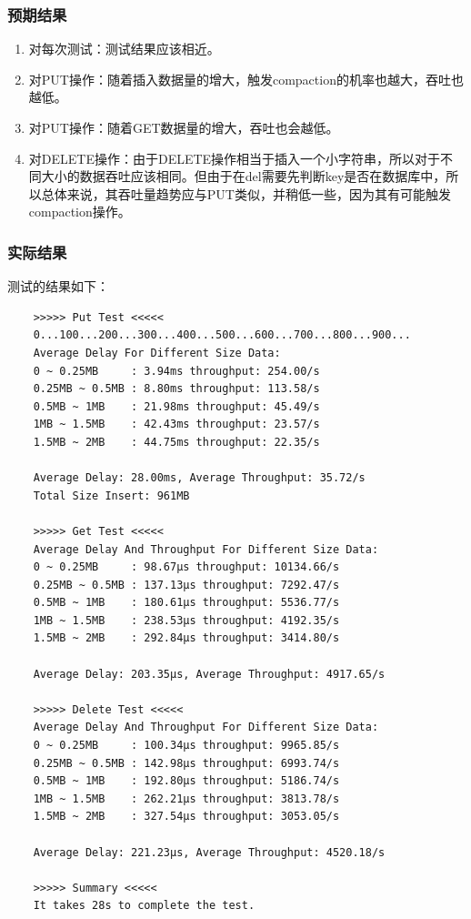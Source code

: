 \documentclass{ctexart}
\begin{document}
\subsubsection{预期结果}
\begin{enumerate}
  \item 对每次测试：测试结果应该相近。
  \item 对PUT操作：随着插入数据量的增大，触发compaction的机率也越大，吞吐也越低。
  \item 对PUT操作：随着GET数据量的增大，吞吐也会越低。
  \item 对DELETE操作：由于DELETE操作相当于插入一个小字符串，所以对于不同大小的数据吞吐应该相同。但由于在del需要先判断key是否在数据库中，所以总体来说，其吞吐量趋势应与PUT类似，并稍低一些，因为其有可能触发compaction操作。
\end{enumerate}

\subsubsection{实际结果}
测试的结果如下：
\begin{verbatim}
    >>>>> Put Test <<<<<
    0...100...200...300...400...500...600...700...800...900...
    Average Delay For Different Size Data:
    0 ~ 0.25MB     : 3.94ms throughput: 254.00/s
    0.25MB ~ 0.5MB : 8.80ms throughput: 113.58/s
    0.5MB ~ 1MB    : 21.98ms throughput: 45.49/s
    1MB ~ 1.5MB    : 42.43ms throughput: 23.57/s
    1.5MB ~ 2MB    : 44.75ms throughput: 22.35/s
    
    Average Delay: 28.00ms, Average Throughput: 35.72/s
    Total Size Insert: 961MB
    
    >>>>> Get Test <<<<<
    Average Delay And Throughput For Different Size Data:
    0 ~ 0.25MB     : 98.67µs throughput: 10134.66/s
    0.25MB ~ 0.5MB : 137.13µs throughput: 7292.47/s
    0.5MB ~ 1MB    : 180.61µs throughput: 5536.77/s
    1MB ~ 1.5MB    : 238.53µs throughput: 4192.35/s
    1.5MB ~ 2MB    : 292.84µs throughput: 3414.80/s
    
    Average Delay: 203.35µs, Average Throughput: 4917.65/s
    
    >>>>> Delete Test <<<<<
    Average Delay And Throughput For Different Size Data:
    0 ~ 0.25MB     : 100.34µs throughput: 9965.85/s
    0.25MB ~ 0.5MB : 142.98µs throughput: 6993.74/s
    0.5MB ~ 1MB    : 192.80µs throughput: 5186.74/s
    1MB ~ 1.5MB    : 262.21µs throughput: 3813.78/s
    1.5MB ~ 2MB    : 327.54µs throughput: 3053.05/s
    
    Average Delay: 221.23µs, Average Throughput: 4520.18/s
    
    >>>>> Summary <<<<<
    It takes 28s to complete the test.
\end{verbatim}
\end{document}
